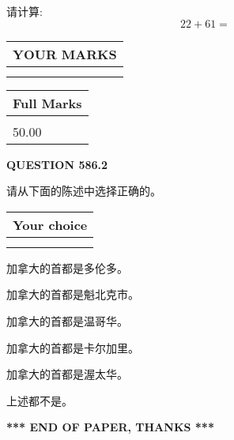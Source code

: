 \documentclass{ctexart}
\begin{document}
  
 
请计算:
\begin{equation}
22 +  %
61 = \nonumber
\end{equation}
 

 

 
  
\vspace{0.2in}
  
\noindent\begin{tabular}{|l|}
\hline
 YOUR MARKS  \\
\hline
 \\ 
 \\ 
\hline
\end{tabular}
\hspace{0.05in} \begin{tabular}{|l|}
\hline
 Full Marks  \\
\hline
 \\ 
50.00 \\
\hline
\end{tabular}
{\textbf{\Large{QUESTION
586.2 
}}}
  
  
请从下面的陈述中选择正确的。
  
  
\noindent\hspace{3.0in} \begin{tabular}{|l|}
\hline
Your choice \\
\hline
 \\ 
 \\ 
\hline
\end{tabular}
  
  
 
 
加拿大的首都是多伦多。
 
 
加拿大的首都是魁北克市。
 
 
加拿大的首都是温哥华。
 
 
加拿大的首都是卡尔加里。
 
 
加拿大的首都是渥太华。
 
 
 上述都不是。
 
 
   
   
 \vspace{0.2in}
 
   
   
   
   
\vspace{1.0in} 
{\textbf{\large{ *** END OF PAPER, THANKS *** }}} 
   
\end{document}
